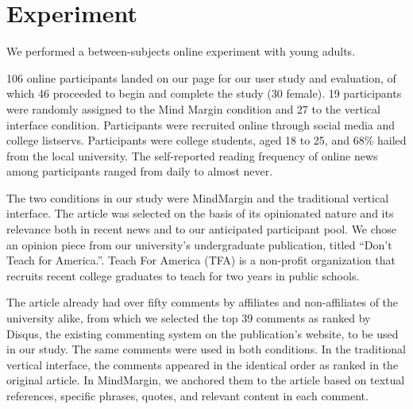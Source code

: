 \section{Experiment}

We performed a between-subjects online experiment with young adults. %

106 online participants landed on our page for our user study and evaluation, of which 46 proceeded to begin and complete the study (30 female). 19 participants were randomly assigned to the Mind Margin condition and 27 to the vertical interface condition.  Participants were recruited online through social media and college listservs. Participants were college students, aged 18 to 25, and 68\% hailed from the local university. The self-reported reading frequency of online news among participants ranged from daily to almost never. 

The two conditions in our study were MindMargin and the traditional vertical interface. The article was selected on the basis of its opinionated nature and its relevance both in recent news and to our anticipated participant pool. We chose an opinion piece from our university's undergraduate publication, titled ``Don't Teach for America.''. Teach For America (TFA) is a non-profit organization that recruits recent college graduates to teach for two years in public schools. 

The article already had over fifty comments by affiliates and non-affiliates of the university alike, from which we selected the top 39 comments as ranked by Disqus, the existing commenting system on the publication's website, to be used in our study. The same comments were used in both conditions. In the traditional vertical interface, the comments appeared in the identical order as ranked in the original article. In MindMargin, we anchored them to the article based on textual references, specific phrases, quotes, and relevant content in each comment. 



